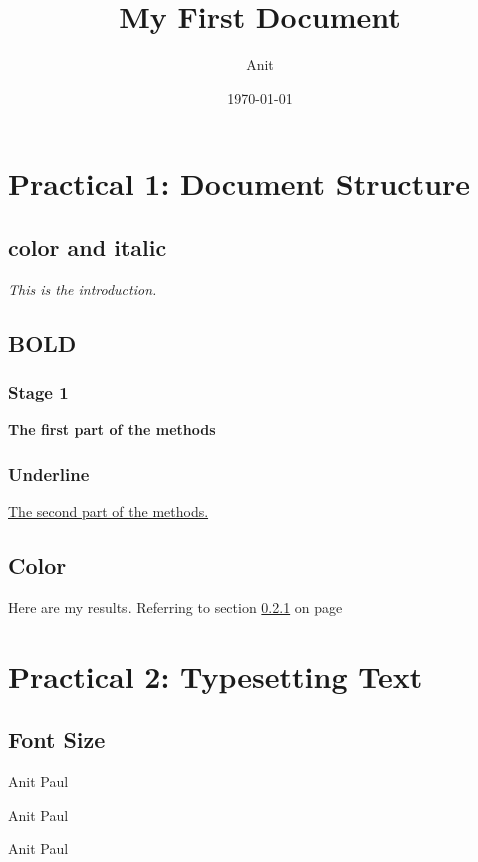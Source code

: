 \documentclass[a4paper,12pt]{report}
\begin{document}
\title{My First Document}


\author{Anit}
\date{\today}
\maketitle

\tableofcontents
\newpage
{}
\chapter*{Practical 1: Document Structure}
\section{color and italic}
\textit{\color{red}This is the introduction.}

\section{BOLD}

\subsection{Stage 1}
\label{sec1}
\textbf{The first part of the methods}

\subsection{Underline}
\underline{The second part of the methods.}

\section{Color}
{\color{blue}Here are my results. Referring to section \ref{sec1} on page \pageref{sec1}}
\chapter*{Practical 2: Typesetting Text}
\section{Font Size}

{\tiny Anit Paul}

{\scriptsize Anit Paul}

{\footnotesize Anit Paul}
\end{document}
